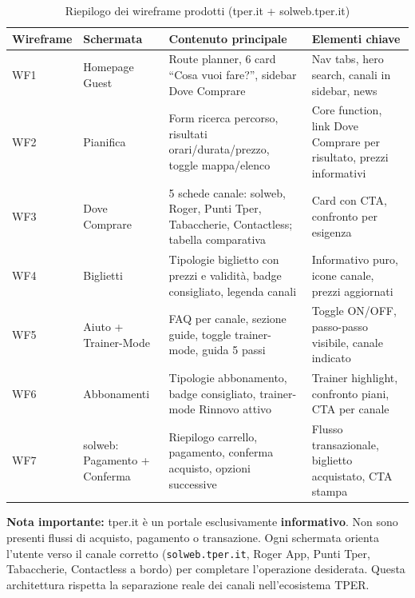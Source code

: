 ﻿\documentclass[11pt,a4paper]{article}
\begin{document}
\begin{table}[H]
\centering
\small
\renewcommand{\arraystretch}{1.25}
\begin{tabular}{|p{1.8cm}|p{2.8cm}|p{5.2cm}|p{5.2cm}|}
\hline
\textbf{Wireframe} & \textbf{Schermata} & \textbf{Contenuto principale} & \textbf{Elementi chiave} \\
\hline
WF1 & Homepage Guest & Route planner, 6 card ``Cosa vuoi fare?'', sidebar Dove Comprare & Nav tabs, hero search, canali in sidebar, news \\
\hline
WF2 & Pianifica & Form ricerca percorso, risultati orari/durata/prezzo, toggle mappa/elenco & Core function, link Dove Comprare per risultato, prezzi informativi \\
\hline
WF3 & Dove Comprare & 5 schede canale: solweb, Roger, Punti Tper, Tabaccherie, Contactless; tabella comparativa & Card con CTA, confronto per esigenza \\
\hline
WF4 & Biglietti & Tipologie biglietto con prezzi e validit\`a, badge consigliato, legenda canali & Informativo puro, icone canale, prezzi aggiornati \\
\hline
WF5 & Aiuto + Trainer-Mode & FAQ per canale, sezione guide, toggle trainer-mode, guida 5 passi & Toggle ON/OFF, passo-passo visibile, canale indicato \\
\hline
WF6 & Abbonamenti & Tipologie abbonamento, badge consigliato, trainer-mode Rinnovo attivo & Trainer highlight, confronto piani, CTA per canale \\
\hline
WF7 & solweb: Pagamento + Conferma & Riepilogo carrello, pagamento, conferma acquisto, opzioni successive & Flusso transazionale, biglietto acquistato, CTA stampa \\
\hline
\end{tabular}
\caption{Riepilogo dei wireframe prodotti (tper.it + solweb.tper.it)}
\label{tab:wfsum}
\end{table}

\vspace{0.2cm}

\begin{tcolorbox}[summarybox]
\small
\textbf{Nota importante:} tper.it \`e un portale esclusivamente \textbf{informativo}. Non sono presenti flussi di acquisto, pagamento o transazione. Ogni schermata orienta l'utente verso il canale corretto (\texttt{solweb.tper.it}, Roger App, Punti Tper, Tabaccherie, Contactless a bordo) per completare l'operazione desiderata. Questa architettura rispetta la separazione reale dei canali nell'ecosistema TPER.
\end{tcolorbox}
\end{document}
